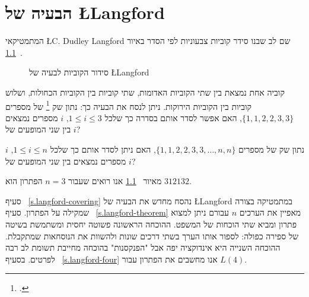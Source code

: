 
\chapter{הבעיה של 
\L{Langford}}
\label{c.langford}

המתמטיקאי
\L{C. Dudley Langford}
שם לב שבנו סידר קוביות צבעוניות לפי הסדר באיור%
~\ref{f.langford}.
\begin{figure}[htb]
\begin{center}
\end{center}
\caption{סידור הקוביות לבעיה של \L{Langford}}\label{f.langford}
\end{figure}

קוביה אחת נמצאת בין שתי הקוביות האדומות, שתי קוביות בין הקוביות הכחולות, ושלוש קוביות בין הקוביות הירוקות. ניתן לנסח את הבעיה כך:
נתון שק%
\footnote{.} של מספרים
$\{1,1,2,2,3,3\}$,
האם אפשר לסדר אותם בסדרה כך שלכל
$1\leq i \leq 3$,
$i$
מספרים נמצאים בין שני המופעים של
$i$?

\begin{definition}
נתון שק של מספרים
$\{1,1,2,2,3,3,\ldots,n,n\}$,
האם ניתן לסדר אותם כך שלכל
$1\leq i \leq n$, $i$
מספרים נמצאים בין שני המופעים של
$i$?
\end{definition}
מאיור%
~\ref{f.langford}
אנו רואים שעבור 
$n=3$
הפתרון הוא
$312132$.

סעיף%
~\ref{s.langford-covering} 
נהסח מחדש את הבעיה של
\L{Langford}
במתמטיקה בצורה שמקילה על הפתרון. סעיף%
~\ref{s.langford-theorem}
מאפיין את הערכים 
$n$
עבורם ניתן למצוא פתרון ומביא שתי הוכחות של המשפט. ההוכחה הראשונה פשוטה יחסית ומשתמשת בשיטה של ספירה כפולה: לספור אותו הערך בשתי דרכים שונות ולהשוות את הנוסחאות שמתקבלת. ההוכחה השנייה היא אינדוקציה יפה אבל "הפנקסנות" בהוכחה מחייבת תשומת לב רבה לפרטים. בסעיף%
~\ref{s.langford-four}
אנו מחשבים את הפתרון עבור
$L(4)$.


